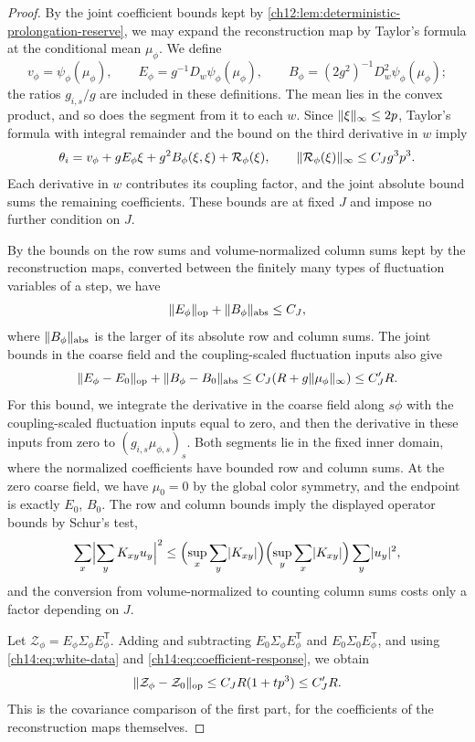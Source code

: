 \begin{proof}
By the joint coefficient bounds kept by \cref{ch12:lem:deterministic-prolongation-reserve}, we may expand the reconstruction map by Taylor's formula at the conditional mean $\mu_\phi$. We define
\[
 v_\phi=\psi_\phi(\mu_\phi),\qquad E_\phi=g^{-1}D_w\psi_\phi(\mu_\phi),\qquad B_\phi=(2g^2)^{-1}D_w^2\psi_\phi(\mu_\phi);
\]
the ratios $g_{i,s}/g$ are included in these definitions. The mean lies in the convex product, and so does the segment from it to each $w$. Since $\lVert \xi\rVert_\infty\le2p$, Taylor's formula with integral remainder and the bound on the third derivative in $w$ imply
\begin{equation}\label{ch14:eq:true-mean-expansion}
 \theta_i=v_\phi+gE_\phi\xi+g^2B_\phi(\xi,\xi)+\mathcal R_\phi(\xi),\qquad\lVert \mathcal R_\phi(\xi)\rVert_\infty\le C_Jg^3p^3.
\end{equation}
Each derivative in $w$ contributes its coupling factor, and the joint absolute bound sums the remaining coefficients. These bounds are at fixed $J$ and impose no further condition on $J$.

By the bounds on the row sums and volume-normalized column sums kept by the reconstruction maps, converted between the finitely many types of fluctuation variables of a step, we have
\[
 \lVert E_\phi\rVert_{\mathrm{op}}+\lVert B_\phi\rVert_{\mathrm{abs}}\le C_J,
\]
where $\lVert B_\phi\rVert_{\mathrm{abs}}$ is the larger of its absolute row and column sums. The joint bounds in the coarse field and the coupling-scaled fluctuation inputs also give
\begin{equation}\label{ch14:eq:coefficient-response}
 \lVert E_\phi-E_0\rVert_{\mathrm{op}}+\lVert B_\phi-B_0\rVert_{\mathrm{abs}}\le C_J(R+g\lVert \mu_\phi\rVert_\infty)\le C_J'R.
\end{equation}
For this bound, we integrate the derivative in the coarse field along $s\phi$ with the coupling-scaled fluctuation inputs equal to zero, and then the derivative in these inputs from zero to $(g_{i,s}\mu_{\phi,s})_s$. Both segments lie in the fixed inner domain, where the normalized coefficients have bounded row and column sums. At the zero coarse field, we have $\mu_0=0$ by the global color symmetry, and the endpoint is exactly $E_0$, $B_0$. The row and column bounds imply the displayed operator bounds by Schur's test,
\[
 \sum_x\Bigl\lvert\sum_yK_{xy}u_y\Bigr\rvert^2\le\Bigl(\sup_x\sum_y\lvert K_{xy}\rvert\Bigr)\Bigl(\sup_y\sum_x\lvert K_{xy}\rvert\Bigr)\sum_y\lvert u_y\rvert^2,
\]
and the conversion from volume-normalized to counting column sums costs only a factor depending on $J$.

Let $\mathcal Z_\phi=E_\phi\Sigma_\phi E_\phi^{\mathsf T}$. Adding and subtracting $E_0\Sigma_\phi E_\phi^{\mathsf T}$ and $E_0\Sigma_0E_\phi^{\mathsf T}$, and using \eqref{ch14:eq:white-data} and \eqref{ch14:eq:coefficient-response}, we obtain
\begin{equation}\label{ch14:eq:covariance-response}
 \lVert \mathcal Z_\phi-\mathcal Z_0\rVert_{\mathrm{op}}\le C_JR(1+tp^3)\le C_J'R.
\end{equation}
This is the covariance comparison of the first part, for the coefficients of the reconstruction maps themselves.


\end{proof}
